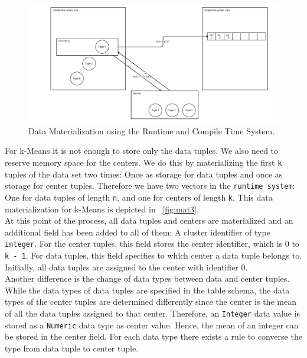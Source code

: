 \begin{figure}[htsb]
  \centering
  \includegraphics[scale=0.25]{figures/mat2}
  \caption[Data Materialization using the Runtime and Compile Time System]{Data Materialization using the Runtime and Compile Time System.}
  \label{fig:mat2}
\end{figure}

For k-Means it is not enough to store only the data tuples. We also need to reserve memory space for the centers. We do this by materializing the first \texttt{k} tuples of the data set two times: Once as storage for data tuples and once as storage for center tuples. Therefore we have two vectors in the \texttt{runtime system}: One for data tuples of length \texttt{n}, and one for centers of length \texttt{k}. This data materialization for k-Means is depicted in ~\autoref{fig:mat3}.
\\ 
At this point of the process, all data tuples and centers are materialized and an additional field has been added to all of them: A cluster identifier of type \texttt{integer}. For the center tuples, this field stores the center identifier, which is 0 to \texttt{k - 1}. For data tuples, this field specifies to which center a data tuple belongs to. Initially, all data tuples are assigned to the center with identifier 0. 
\\
Another difference is the change of data types between data and center tuples. While the data types of data tuples are specified in the table schema, the data types of the center tuples are determined differently since the center is the mean of all the data tuples assigned to that center. Therefore, an \texttt{Integer} data value is stored as a \texttt{Numeric} data type as center value. Hence, the mean of an integer can be stored in the center field. For each data type there exists a rule to converse the type from data tuple to center tuple.



